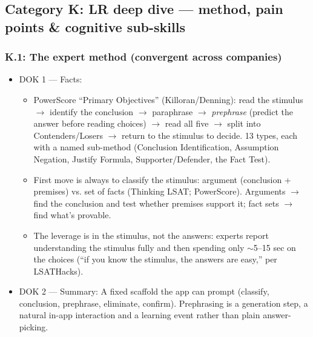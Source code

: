 \documentclass[11pt]{article}
\begin{document}
\subsection*{Category K: LR deep dive --- method, pain points \& cognitive sub-skills}
\subsubsection*{K.1: The expert method (convergent across companies)}
\begin{itemize}
\item DOK 1 --- Facts:
\begin{itemize}
\item PowerScore \enquote{Primary Objectives} (Killoran/Denning): read the stimulus $\rightarrow$ identify the conclusion $\rightarrow$ paraphrase $\rightarrow$ \textit{prephrase} (predict the answer before reading choices) $\rightarrow$ read all five $\rightarrow$ split into Contenders/Losers $\rightarrow$ return to the stimulus to decide. 13 types, each with a named sub-method (Conclusion Identification, Assumption Negation, Justify Formula, Supporter/Defender, the Fact Test).
\item First move is always to classify the stimulus: argument (conclusion + premises) vs. set of facts (Thinking LSAT; PowerScore). Arguments $\rightarrow$ find the conclusion and test whether premises support it; fact sets $\rightarrow$ find what's provable.
\item The leverage is in the stimulus, not the answers: experts report understanding the stimulus fully and then spending only $\sim$5--15 sec on the choices (\enquote{if you know the stimulus, the answers are easy,} per LSATHacks).
\end{itemize}
\item DOK 2 --- Summary: A fixed scaffold the app can prompt (classify, conclusion, prephrase, eliminate, confirm). Prephrasing is a generation step, a natural in-app interaction and a learning event rather than plain answer-picking.
\end{itemize}
\end{document}
